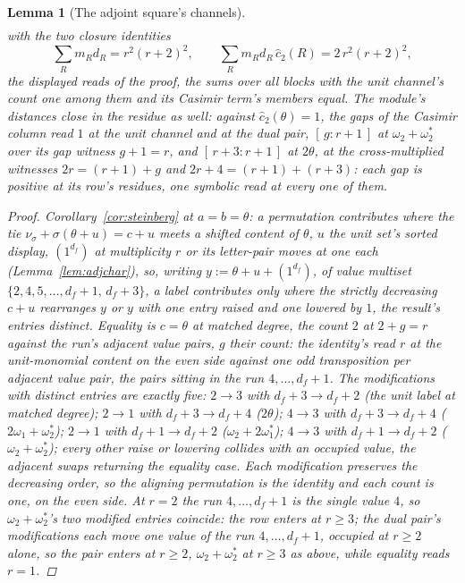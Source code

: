 \documentclass[11pt]{article}
\newtheorem{lemma}{Lemma}
\theoremstyle{definition}
\begin{document}
\begin{lemma}[The adjoint square's channels]
\[\begin{array}{lccc}
\end{array}
\]
with the two closure identities
\[
\sum_Rm_Rd_R=r^2(r+2)^2,
\qquad
\sum_Rm_Rd_R\,\hat c_2(R)=2\,r^2(r+2)^2 ,
\]
the displayed reads of the proof, the sums over all blocks with the
unit channel's count one among them and its Casimir term's members
equal. The module's distances close in the residue as well:
against $\hat c_2(\theta)=1$, the gaps of the Casimir column read
$1$ at the unit channel and at the dual pair,
$[\,g:r+1\,]$ at $\omega_2{+}\omega_2^*$ over its gap witness
$g+1=r$, and $[\,r+3:r+1\,]$ at
$2\theta$, at the cross-multiplied witnesses $2r=(r+1)+g$ and
$2r+4=(r+1)+(r+3)$: each gap is positive at its row's residues,
one symbolic read at every one of them.
\begin{proof}
Corollary~\ref{cor:steinberg} at $a=b=\theta$: a permutation contributes
where the tie $\nu_\sigma+\sigma(\theta+u)=c+u$ meets a
shifted content of $\theta$, $u$ the unit set's sorted display,
$(1^{d_f})$ at multiplicity $r$ or its letter-pair moves at one each
(Lemma~\ref{lem:adjchar}), so, writing $y:=\theta+u+(1^{d_f})$, of value
multiset $\{2,4,5,\dots,d_f{+}1,\,d_f{+}3\}$, a label contributes only where
the strictly decreasing $c+u$ rearranges $y$ or $y$ with one entry
raised and one lowered by $1$, the result's entries distinct. Equality is
$c=\theta$ at matched degree, the count $2$ at $2+g=r$ against the
run's adjacent value pairs, $g$ their count: the identity's
read $r$ at the unit-monomial content on the even side against one odd
transposition per adjacent
value pair, the pairs sitting in the run $4,\dots,d_f{+}1$. The modifications
with distinct entries are exactly five: $2\to3$ with $d_f{+}3\to d_f{+}2$
(the unit label at matched degree); $2\to1$ with $d_f{+}3\to d_f{+}4$
($2\theta$); $4\to3$ with $d_f{+}3\to d_f{+}4$ ($2\omega_1{+}\omega_2^*$);
$2\to1$ with
$d_f{+}1\to d_f{+}2$ ($\omega_2{+}2\omega_1^*$); $4\to3$ with $d_f{+}1\to d_f{+}2$
($\omega_2{+}\omega_2^*$); every other
raise or lowering collides with an occupied value, the adjacent swaps
returning the equality case. Each modification preserves the decreasing
order, so the aligning permutation is the identity and each count is
one, on the even side. At $r=2$ the run $4,\dots,d_f{+}1$ is the single value $4$, so
$\omega_2{+}\omega_2^*$'s two
modified entries coincide: the row enters at $r\ge3$; the dual
pair's modifications each move one value of the run $4,\dots,d_f{+}1$,
occupied at $r\ge2$ alone, so the pair enters at $r\ge2$,
$\omega_2{+}\omega_2^*$ at $r\ge3$ as above, while equality reads
$r=1$.


\end{proof}
\end{lemma}
\end{document}
